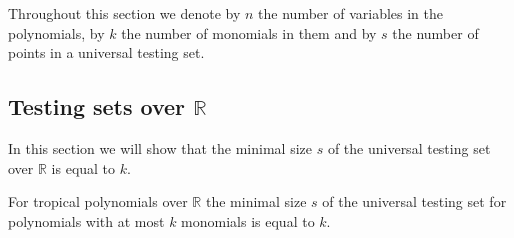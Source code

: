 \documentclass[11pt]{article}
\newcommand{\bb}[1]{\mathbb{#1}}
\begin{document}
Throughout this section we denote by $n$ the number of variables in the polynomials, by $k$ the number of monomials in them and by $s$ the number of points in a universal testing set.

\subsection{Testing sets over $\bb{R}$}


In this section we will show that the minimal size $s$ of the universal testing set over $\bb{R}$ is equal to $k$.

\begin{theorem} \label{thm:univ_set_r}
For tropical polynomials over $\bb{R}$ the minimal size $s$ of the universal testing set for polynomials with at most $k$ monomials is equal to $k$.
\end{theorem}
\end{document}

